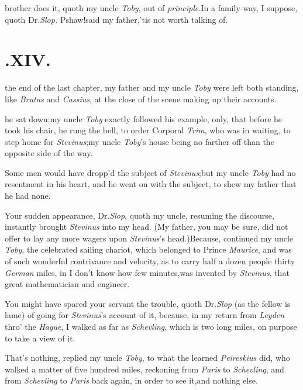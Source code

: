 \documentclass{article}
\begin{document}
 brother does it, quoth my uncle
\textit{Toby}, out of \textit{principle.}\tsh In a family-way,
I suppose, quoth Dr.\@ \textit{Slop.}\tsh\break
Pshaw!\tsk said my father,\tsk ’tis not worth\break
talking of.

\bigskip

\section{.\enspace  XIV.}

 the end of the last chapter, my\break
father and my uncle \textit{Toby} were left both standing, like
\textit{Brutus} and \textit{Cassius}, at the close of the scene making
up their accounts.

\break
\tsk he sat down;\tsk my uncle \textit{Toby}
exactly followed his example, only, that before he took his chair, he rung the bell,
to order Corporal \textit{Trim}, who was in waiting, to step home for
\textit{Stevinus};\tsk my uncle \textit{Toby}’s house being no farther off than the
opposite side of the way.

Some men would have dropp’d the subject of
\textit{Stevinus};\tsk but my uncle \textit{Toby} had no resentment
in his heart, and he went on with the subject, to shew my father
that he had none.

Your sudden appearance, Dr.\@ \textit{Slop},\break
quoth my uncle,
resuming the discourse, instantly brought \textit{Stevinus} into my
head. (My father, you may be sure, did not offer to lay any more
wagers upon \textit{Stevinus}’s head.)\tsh Because, continued my
uncle \textit{Toby}, the celebrated sailing chariot,
which belonged to Prince \textit{Maurice}, and was of such wonderful
contrivance and velocity, as to carry half a dozen people thirty
\textit{German} miles, in I don’t know how few
minutes,\tsh was invented by \textit{Stevinus}, that great
mathematician and engineer.

You might have spared your servant the trouble, quoth Dr.\@ \textit{Slop} (as the fellow is lame) of going for
\textit{Stevinus}’s account of it, because, in my return from
\textit{Leyden} thro’ the \textit{Hague}, I walked as far as
\textit{Schev\-ling}, which is two long miles, on
purpose\break 
to take a view of it.

\tsk That’s nothing, replied my uncle \textit{Toby}, to what the
learned \textit{Peireskius} did, who walked a matter of five hundred
miles, reckoning from \textit{Paris} to
\textit{Schevling}, and from
\textit{Schevling} to \textit{Paris} back again, in order to see
it,\tsk and nothing else.
\end{document}
